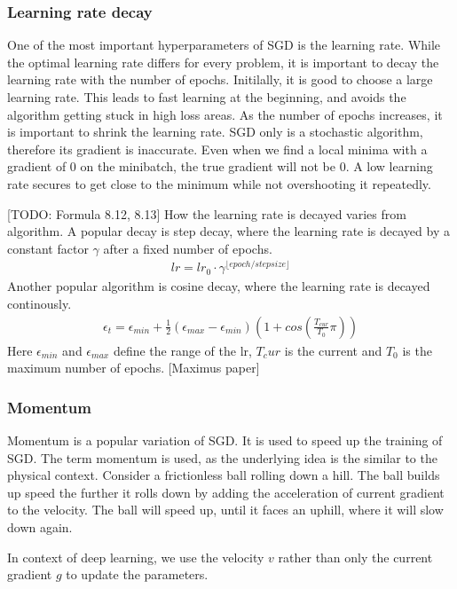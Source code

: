 \subsubsection{Learning rate decay}
One of the most important hyperparameters of SGD is the learning rate. While the
optimal learning rate differs for every problem, it is important to decay the
learning rate with the number of epochs. Initilally, it is good to choose a
large learning rate. This leads to fast learning at the beginning, and avoids
the algorithm getting stuck in high loss areas. As the number of epochs
increases, it is important to shrink the learning rate. SGD only is a stochastic
algorithm, therefore its gradient is inaccurate. Even when we find a local
minima with a gradient of 0 on the minibatch, the true gradient will not be 0. A
low learning rate secures to get close to the minimum while not overshooting it
repeatedly.

[TODO: Formula 8.12, 8.13] How the learning rate is decayed varies from
algorithm. A popular decay is step decay, where the learning rate is decayed by
a constant factor $\gamma$ after a fixed number of epochs.
\begin{align}
    lr = lr_0 \cdot \gamma^{\lfloor epoch/stepsize \rfloor}
\end{align}
Another popular algorithm is cosine decay, where the learning rate is decayed
continously.
\begin{align}\label{eq:cosine_decay}
    \epsilon_t = \epsilon_{min} + \frac{1}{2} (\epsilon_{max} - \epsilon_{min})(1+cos(\frac{T_{cur}}{T_0}\pi))
\end{align}
Here $\epsilon_{min}$ and $\epsilon_{max}$ define the range of the lr, $T_cur$ is
the current and $T_0$ is the maximum number of epochs.
[Maximus paper]

\subsubsection{Momentum}\label{sub:Momentum}
Momentum is a popular variation of SGD. It is used to speed up the training of
SGD. The term momentum is used, as the underlying idea is the similar to the
physical context. Consider a frictionless ball rolling down a hill. The ball
builds up speed the further it rolls down by adding the acceleration of current
gradient to the velocity. The ball will speed up, until it faces an uphill,
where it will slow down again.

In context of deep learning, we use the velocity $v$ rather than only the
current gradient $g$ to update the parameters.

